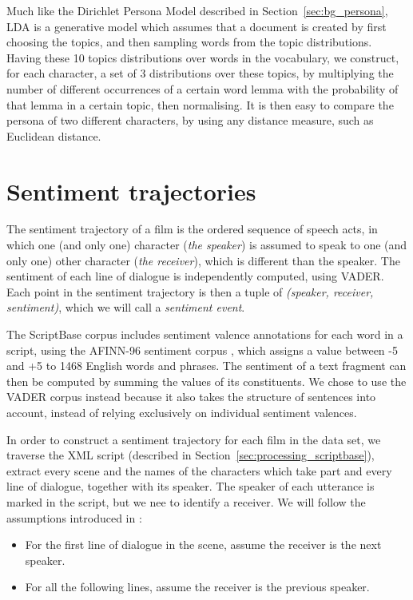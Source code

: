 \documentclass[bsc,frontabs,singlespacing,parskip, twoside]{infthesis}
\begin{document}
Much like the Dirichlet Persona Model described in Section~\ref{sec:bg_persona}, LDA is a generative model which assumes that a document is created by first choosing the topics, and then sampling words from the topic distributions. Having these 10 topics distributions over words in the vocabulary, we construct, for each character, a set of 3 distributions over these topics, by multiplying the number of different occurrences of a certain word lemma with the probability of that lemma in a certain topic, then normalising. It is then easy to compare the persona of two different characters, by using any distance measure, such as Euclidean distance.

\section{Sentiment trajectories}
\label{sec:trajectories}
The sentiment trajectory of a film is the ordered sequence of speech acts, in which one (and only one) character (\textit{the speaker}) is assumed to speak to one (and only one) other character (\textit{the receiver}), which is different than the speaker. The sentiment of each line of dialogue is independently computed, using VADER. Each point in the sentiment trajectory is then a tuple of \textit{(speaker, receiver, sentiment)}, which we will call a \textit{sentiment event}.

The ScriptBase corpus includes sentiment valence annotations for each word in a script, using the AFINN-96 sentiment corpus \cite{nielsen2011new}, which assigns a value between -5 and +5 to 1468 English words and phrases. The sentiment of a text fragment can then be computed by summing the values of its constituents. We chose to use the VADER corpus instead because it also takes the structure of sentences into account, instead of relying exclusively on individual sentiment valences.

In order to construct a sentiment trajectory for each film in the data set, we traverse the XML script (described in Section~\ref{sec:processing_scriptbase}), extract every scene and the names of the characters which take part and every line of dialogue, together with its speaker. The speaker of each utterance is marked in the script, but we nee to identify a receiver. We will follow the assumptions introduced in \cite{Nalisnick2013}:
\begin{itemize}
	\item For the first line of dialogue in the scene, assume the receiver is the next speaker.
	\item For all the following lines, assume the receiver is the previous speaker.
\end{itemize}
\end{document}

